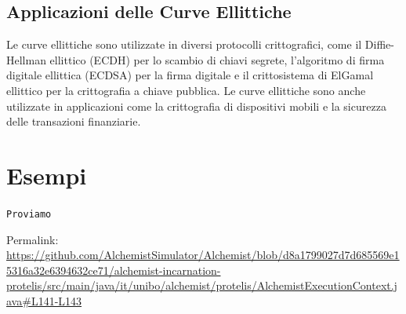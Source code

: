 \documentclass[a4paper,12pt]{report}
\begin{document}
\section{Applicazioni delle Curve Ellittiche}

Le curve ellittiche sono utilizzate in diversi protocolli crittografici, come il Diffie-Hellman ellittico (ECDH) per lo scambio di chiavi segrete, l'algoritmo di firma digitale ellittica (ECDSA) per la firma digitale e il crittosistema di ElGamal ellittico per la crittografia a chiave pubblica. Le curve ellittiche sono anche utilizzate in applicazioni come la crittografia di dispositivi mobili e la sicurezza delle transazioni finanziarie.

\chapter{Esempi}
\texttt{Proviamo}

Permalink: \url{https://github.com/AlchemistSimulator/Alchemist/blob/d8a1799027d7d685569e15316a32e6394632ce71/alchemist-incarnation-protelis/src/main/java/it/unibo/alchemist/protelis/AlchemistExecutionContext.java#L141-L143}

\nocite{*}


\end{document}
